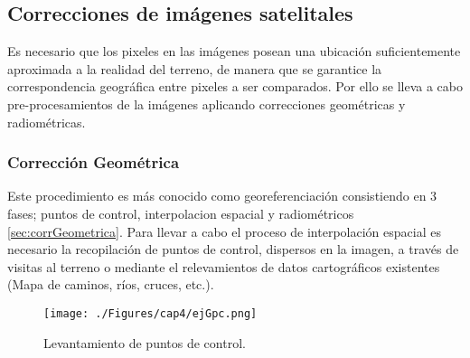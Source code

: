 \subsection{Correcciones de im\'agenes satelitales}\label{sec:coorImsat}
Es necesario que los pixeles en las im\'agenes posean una ubicaci\'on suficientemente aproximada a la realidad del terreno, de manera que se garantice la correspondencia geogr\'afica entre pixeles a ser comparados. Por ello se lleva a cabo pre-procesamientos de la im\'agenes aplicando correcciones geom\'etricas y radiom\'etricas.
\subsubsection{Correcci\'on Geom\'etrica}
Este procedimiento es m\'as conocido como georeferenciaci\'on consistiendo en 3 fases; puntos de control, interpolacion espacial y radiom\'etricos \ref{sec:corrGeometrica}. Para llevar a cabo el proceso de interpolaci\'on espacial es necesario la recopilaci\'on de puntos de control, dispersos en la imagen, a trav\'es de visitas al terreno o mediante el relevamientos de datos cartogr\'aficos existentes (Mapa de caminos, ríos, cruces, etc.).
\begin{figure}[H]
	\centering
	\texttt{[image: ./Figures/cap4/ejGpc.png]}
	\caption{Levantamiento de puntos de control.}
	\label{fig:gcp}
\end{figure}

